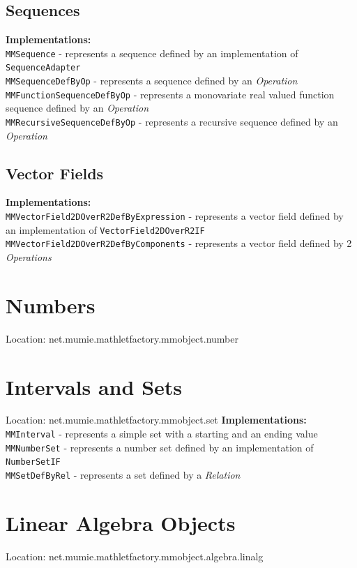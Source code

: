 \documentclass[a4paper,12pt]{book}
\newcommand{\op}{\emph{Operation }}
\newcommand{\ops}{\emph{Operations }}
\newcommand{\rel}{\emph{Relation }}
\begin{document}
\begin{appendix}
      
    \subsection{Sequences}
      {\bf Implementations:}\\
        \verb|MMSequence| - represents a sequence defined by an implementation of \verb|SequenceAdapter|\\
        \verb|MMSequenceDefByOp| - represents a sequence defined by an \op\\
        \verb|MMFunctionSequenceDefByOp| - represents a monovariate real valued function sequence defined by an \op\\
        \verb|MMRecursiveSequenceDefByOp| - represents a recursive sequence defined by an \op
        
        
    \subsection{Vector Fields}
      {\bf Implementations:}\\
        \verb|MMVectorField2DOverR2DefByExpression| - represents a vector field defined by an implementation of \verb|VectorField2DOverR2IF|\\
        \verb|MMVectorField2DOverR2DefByComponents| - represents a vector field defined by 2 \ops
  
  \section{Numbers}
    Location: net.mumie.mathletfactory.mmobject.number
  
  \section{Intervals and Sets}
    Location: net.mumie.mathletfactory.mmobject.set
      {\bf Implementations:}\\
        \verb|MMInterval| - represents a simple set with a starting and an ending value\\
        \verb|MMNumberSet| - represents a number set defined by an implementation of \verb|NumberSetIF|\\
        \verb|MMSetDefByRel| - represents a set defined by a \rel
  
  \section{Linear Algebra Objects}
    Location: net.mumie.mathletfactory.mmobject.algebra.linalg
    

\end{appendix}
\end{document}
